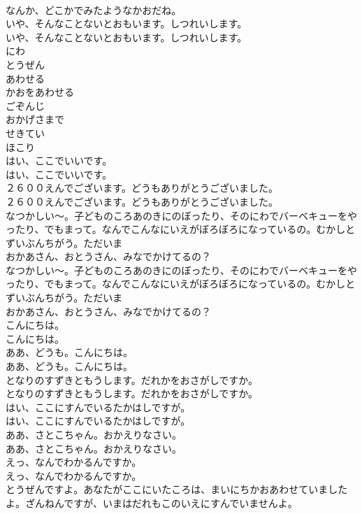 \documentclass[8pt]{extreport}
\begin{document}
\begin{CJK}{UTF8}{min}
\\	なんか、どこかでみたようなかおだね。
\\	いや、そんなことないとおもいます。しつれいします。
\\	いや、そんなことないとおもいます。しつれいします。
\\	にわ
\\	とうぜん
\\	あわせる
\\	かおをあわせる
\\	ごぞんじ
\\	おかげさまで
\\	せきてい
\\	ほこり
\\	はい、ここでいいです。
\\	はい、ここでいいです。
\\	２６００えんでございます。どうもありがとうございました。
\\	２６００えんでございます。どうもありがとうございました。
\\	なつかしい〜。子どものころあのきにのぼったり、そのにわでバーベキューをやったり、でもまって。なんでこんなにいえがぼろぼろになっているの。むかしとずいぶんちがう。ただいま
\\	おかあさん、おとうさん、みなでかけてるの？
\\	なつかしい〜。子どものころあのきにのぼったり、そのにわでバーベキューをやったり、でもまって。なんでこんなにいえがぼろぼろになっているの。むかしとずいぶんちがう。ただいま
\\	おかあさん、おとうさん、みなでかけてるの？
\\	こんにちは。
\\	こんにちは。
\\	ああ、どうも。こんにちは。
\\	ああ、どうも。こんにちは。
\\	となりのすずきともうします。だれかをおさがしですか。
\\	となりのすずきともうします。だれかをおさがしですか。
\\	はい、ここにすんでいるたかはしですが。
\\	はい、ここにすんでいるたかはしですが。
\\	ああ、さとこちゃん。おかえりなさい。
\\	ああ、さとこちゃん。おかえりなさい。
\\	えっ、なんでわかるんですか。
\\	えっ、なんでわかるんですか。
\\	とうぜんですよ。あなたがここにいたころは、まいにちかおあわせていましたよ。ざんねんですが、いまはだれもこのいえにすんでいませんよ。

\end{CJK}
\end{document}
